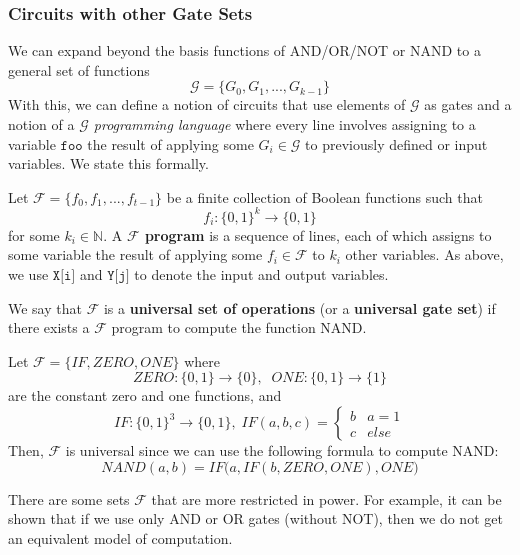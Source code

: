 \documentclass{article}
\begin{document}
  \subsubsection{Circuits with other Gate Sets}
  We can expand beyond the basis functions of AND/OR/NOT or NAND to a general set of functions 
  \[\mathcal{G} = \{G_0, G_1, ..., G_{k-1}\}\]
  With this, we can define a notion of circuits that use elements of $\mathcal{G}$ as gates and a notion of a \textit{$\mathcal{G}$ programming language} where every line involves assigning to a variable $\texttt{foo}$ the result of applying some $G_i \in \mathcal{G}$ to previously defined or input variables. We state this formally. 

  \begin{definition}
  Let $\mathcal{F} = \{f_0, f_1, ..., f_{t-1}\}$ be a finite collection of Boolean functions such that
  \[f_i: \{0,1\}^k \longrightarrow \{0,1\}\]
  for some $k_i \in \mathbb{N}$. A \textbf{$\mathcal{F}$ program} is a sequence of lines, each of which assigns to some variable the result of applying some $f_i \in \mathcal{F}$ to $k_i$ other variables. As above, we use $\texttt{X[i]}$ and $\texttt{Y[j]}$ to denote the input and output variables. 

  We say that $\mathcal{F}$ is a \textbf{universal set of operations} (or a \textbf{universal gate set}) if there exists a $\mathcal{F}$ program to compute the function NAND. 
  \end{definition}

  \begin{example}
  Let $\mathcal{F} = \{IF, ZERO, ONE\}$ where 
  \[ZERO: \{0,1\} \longrightarrow \{0\}, \;\; ONE: \{0,1\} \longrightarrow \{1\}\]
  are the constant zero and one functions, and 
  \[IF: \{0,1\}^3 \longrightarrow \{0,1\}, \; IF (a, b, c) = \begin{cases}
  b & a = 1 \\
  c & else 
  \end{cases}\]
  Then, $\mathcal{F}$ is universal since we can use the following formula to compute NAND: 
  \[NAND(a, b) = IF\big( a, IF(b, ZERO, ONE), ONE\big)\]
  \end{example}

  There are some sets $\mathcal{F}$ that are more restricted in power. For example, it can be shown that if we use only AND or OR gates (without NOT), then we do not get an equivalent model of computation. 
\end{document}
